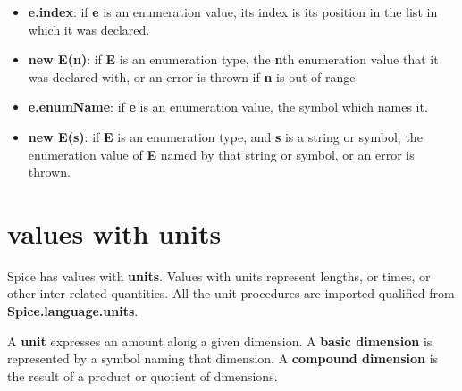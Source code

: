 \documentclass{report}
\begin{document}
\begin{itemize}\item {\bf e.index}: if {\bf e} is an enumeration value, its index is its position
in the list in which it was declared.

\item {\bf new E(n)}: if {\bf E} is an enumeration type, the {\bf n}th enumeration value that it
was declared with, or an error is thrown if {\bf n} is out of range.

\item {\bf e.enumName}: if {\bf e} is an enumeration value, the symbol which names it.

\item {\bf new E(s)}: if {\bf E} is an enumeration type, and {\bf s} is a string or symbol,
the enumeration value of {\bf E} named by that string or symbol, or an error
is thrown.

\end{itemize}\section{values with units}


Spice has values with {\bf units}. Values with units represent lengths, or
times, or other inter-related quantities. All the unit procedures are
imported qualified from {\bf Spice.language.units}.

A {\bf unit} expresses an amount along a given dimension. A {\bf basic dimension} is
represented by a symbol naming that dimension. A {\bf compound dimension} is the
result of a product or quotient of dimensions.
\end{document}
